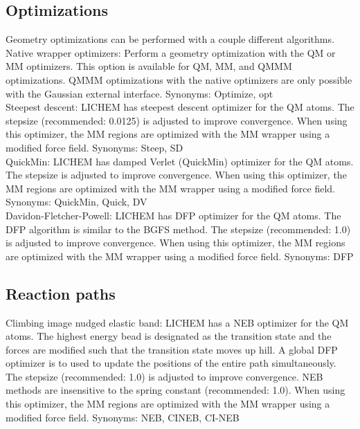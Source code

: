 \documentclass[12pt]{report}
\begin{document}
\subsection{Optimizations}

Geometry optimizations can be performed with a couple different algorithms.
\\

Native wrapper optimizers: Perform a geometry optimization with the QM or
MM optimizers.
This option is available for QM, MM, and QMMM optimizations.
QMMM optimizations with the native optimizers are only possible with the
Gaussian external interface.
Synonyms: Optimize, opt \\

Steepest descent: LICHEM has steepest descent optimizer \cite{} for the QM
atoms.
The stepsize (recommended: 0.0125) is adjusted to improve convergence.
When using this optimizer, the MM regions are optimized with the MM wrapper
using a modified force field.
Synonyms: Steep, SD \\

QuickMin: LICHEM has damped Verlet (QuickMin) optimizer \cite{} for the QM
atoms.
The stepsize is adjusted to improve convergence.
When using this optimizer, the MM regions are optimized with the MM wrapper
using a modified force field.
Synonyms: QuickMin, Quick, DV \\

Davidon-Fletcher-Powell: LICHEM has DFP optimizer \cite{} for the QM atoms.
The DFP algorithm is similar to the BGFS method.
The stepsize (recommended: 1.0) is adjusted to improve convergence.
When using this optimizer, the MM regions are optimized with the MM wrapper
using a modified force field.
Synonyms: DFP

\subsection{Reaction paths}

Climbing image nudged elastic band: LICHEM has a NEB optimizer \cite{}
for the QM atoms.
The highest energy bead is designated as the transition state and the forces
are modified such that the transition state moves up hill.
A global DFP optimizer is to used to update the positions of the entire path
simultaneously.
The stepsize (recommended: 1.0) is adjusted to improve convergence.
NEB methods are insensitive to the spring constant (recommended: 1.0).
When using this optimizer, the MM regions are optimized with the MM wrapper
using a modified force field.
Synonyms: NEB, CINEB, CI-NEB \\
\end{document}
